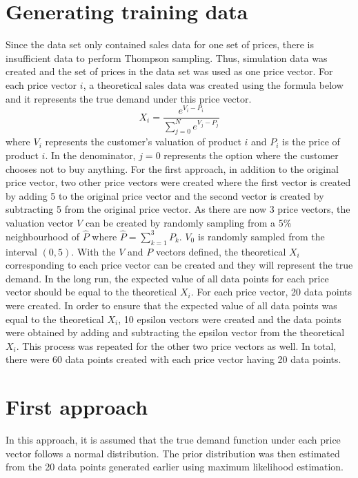 \documentclass[a4paper]{article}
\begin{document}
\section{Generating training data}
\label{sec:theory}
Since the data set only contained sales data for one set of prices, there is insufficient data to perform Thompson sampling. Thus, simulation data was created and the set of prices in the data set was used as one price vector. 
\newline
\newline
For each price vector $i$, a theoretical sales data was created using the formula below and it represents the true demand under this price vector.
\[X_i = \frac{e^{V_i - P_i}}{\sum_{j=0}^{N}e^{V_j - P_j}}\]
where $V_i$ represents the customer's valuation of product $i$ and $P_i$ is the price of product $i$. In the denominator, $j=0$ represents the option where the customer chooses not to buy anything. For the first approach, in addition to the original price vector, two other price vectors were created where the first vector is created by adding 5 to the original price vector and the second vector is created by subtracting 5 from the original price vector. 
\newline
\newline
As there are now 3 price vectors, the valuation vector $V$ can be created by randomly sampling from a 5\% neighbourhood of $\hat{P}$ where $\hat{P}=\sum_{k=1}^{3}P_k$. $V_0$ is randomly sampled from the interval $(0,5).$
\newline
\newline
With the $V$ and $P$ vectors defined, the theoretical $X_i$ corresponding to each price vector can be created and they will represent the true demand. In the long run, the expected value of all data points for each price vector should be equal to the theoretical $X_i$.
\newline
\newline
For each price vector, 20 data points were created. In order to ensure that the expected value of all data points was equal to the theoretical $X_i$, 10 epsilon vectors were created and the data points were obtained by adding and subtracting the epsilon vector from the theoretical $X_i$. This process was repeated for the other two price vectors as well. In total, there were 60 data points created with each price vector having 20 data points.

\section{First approach}
In this approach, it is assumed that the true demand function under each price vector follows a normal distribution. The prior distribution was then estimated from the 20 data points generated earlier using maximum likelihood estimation. 
\end{document}
